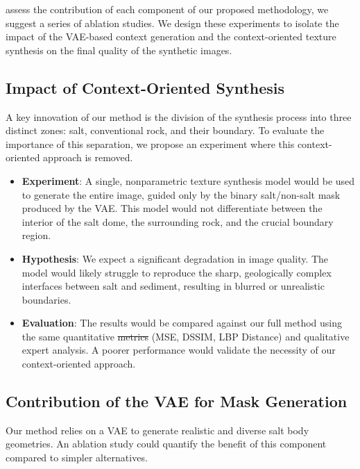 \documentclass{ieeeaccess}
\makeatletter
\providecommand{\DIFaddtex}[1]{{\protect\color{blue}\uwave{#1}}} %
\providecommand{\DIFdeltex}[1]{{\protect\color{red}\sout{#1}}} %
\providecommand{\DIFaddbegin}{} %
\providecommand{\DIFaddend}{} %
\providecommand{\DIFdelbegin}{} %
\providecommand{\DIFdelend}{} %
\providecommand{\DIFadd}[1]{\texorpdfstring{\DIFaddtex{#1}}{#1}} %
\providecommand{\DIFdel}[1]{\texorpdfstring{\DIFdeltex{#1}}{}} %
\newcommand{\DIFscaledelfig}{0.5}
\newlength{\DIFdelgraphicswidth} %
\newlength{\DIFdelgraphicsheight} %
\newcommand{\DIFaddincludegraphics}[2][]{{\color{blue}\fbox{\DIFOincludegraphics[#1]{#2}}}} %
\newcommand{\DIFdelincludegraphics}[2][]{%
\sbox{\DIFdelgraphicsbox}{\DIFOincludegraphics[#1]{#2}}%
\settoboxwidth{\DIFdelgraphicswidth}{\DIFdelgraphicsbox} %
\settoboxtotalheight{\DIFdelgraphicsheight}{\DIFdelgraphicsbox} %
\scalebox{\DIFscaledelfig}{%
\parbox[b]{\DIFdelgraphicswidth}{\usebox{\DIFdelgraphicsbox}\\[-\baselineskip] \rule{\DIFdelgraphicswidth}{0em}}\llap{\resizebox{\DIFdelgraphicswidth}{\DIFdelgraphicsheight}{%
\setlength{\unitlength}{\DIFdelgraphicswidth}%
\begin{picture}(1,1)%
\thicklines\linethickness{2pt} %
{\color[rgb]{1,0,0}\put(0,0){\framebox(1,1){}}}%
{\color[rgb]{1,0,0}\put(0,0){\line( 1,1){1}}}%
{\color[rgb]{1,0,0}\put(0,1){\line(1,-1){1}}}%
\end{picture}%
}\hspace*{3pt}}} %
} %
\DeclareRobustCommand{\DIFaddbegin}{\DIFOaddbegin \let\includegraphics\DIFaddincludegraphics} %
\DeclareRobustCommand{\DIFaddend}{\DIFOaddend \let\includegraphics\DIFOincludegraphics} %
\DeclareRobustCommand{\DIFdelbegin}{\DIFOdelbegin \let\includegraphics\DIFdelincludegraphics} %
\DeclareRobustCommand{\DIFdelend}{\DIFOaddend \let\includegraphics\DIFOincludegraphics} %
\let\sout@orig\sout %
\renewcommand{\sout}[1]{\ifmmode\text{\sout@orig{\ensuremath{#1}}}\else\sout@orig{#1}\fi} %
\makeatother
\begin{document}
 assess the contribution of each component of our proposed methodology, we suggest a series of ablation studies. We design these experiments to isolate the impact of the VAE-based context generation and the context-oriented texture synthesis on the final quality of the synthetic images.

\subsection{Impact of Context-Oriented Synthesis}

A key innovation of our method is the division of the synthesis process into three distinct zones: salt, conventional rock, and their boundary. To evaluate the importance of this separation, we propose an experiment where this context-oriented approach is removed.

\begin{itemize}
    \item \textbf{Experiment}: A single, nonparametric texture synthesis model would be used to generate the entire image, guided only by the binary salt/non-salt mask produced by the VAE. This model would not differentiate between the interior of the salt dome, the surrounding rock, and the crucial boundary region.
    \item \textbf{Hypothesis}: We expect a significant degradation in image quality. The model would likely struggle to reproduce the sharp, geologically complex interfaces between salt and sediment, resulting in blurred or unrealistic boundaries.
    \item \textbf{Evaluation}: The results would be compared against our full method using the same quantitative \DIFdelbegin \DIFdel{metrics }\DIFdelend \DIFaddbegin \DIFadd{measures }\DIFaddend (MSE, DSSIM, LBP Distance) and qualitative expert analysis. A poorer performance would validate the necessity of our context-oriented approach.
\end{itemize}

\subsection{Contribution of the VAE for Mask Generation}

Our method relies on a VAE to generate realistic and diverse salt body geometries. An ablation study could quantify the benefit of this component compared to simpler alternatives.
\end{document}
